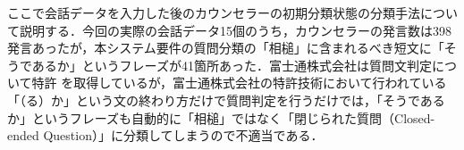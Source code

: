 \documentclass[shuuron]{kuee}
\begin{document}
ここで会話データを入力した後のカウンセラーの初期分類状態の分類手法について説明する．今回の実際の会話データ15個のうち，カウンセラーの発言数は398発言あったが，本システム要件の質問分類の「相槌」に含まれるべき短文に「そうであるか」というフレーズが41箇所あった．富士通株式会社は質問文判定について特許
\cite{tokkyo}
を取得しているが，富士通株式会社の特許技術において行われている「（る）か」という文の終わり方だけで質問判定を行うだけでは，「そうであるか」というフレーズも自動的に「相槌」ではなく「閉じられた質問（Closed-ended Question）」に分類してしまうので不適当である．




\end{document}
